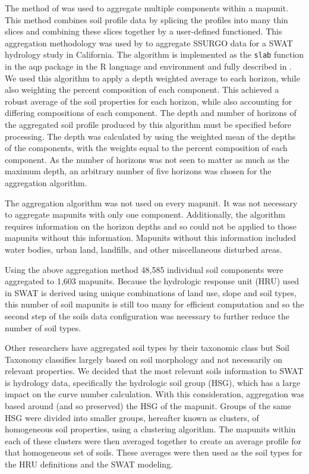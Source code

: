 The method of \citet{beaudette_aqp_2013} was used to aggregate multiple components within a mapunit. This method combines soil profile data by splicing the profiles into many thin slices and combining these slices together by a user-defined functioned. This aggregation methodology was used by \citet{gatzke_soilaggregation_2011} to aggregate SSURGO data for a SWAT hydrology study in California. The algorithm is implemented as the \texttt{slab} function in the aqp package in the R language and environment and fully described in \citet{beaudette_aqp_2013}. We used this algorithm to apply a depth weighted average to each horizon, while also weighting the percent composition of each component. This achieved a robust average of the soil properties for each horizon, while also accounting for differing compositions of each component. The depth and number of horizons of the aggregated soil profile produced by this algorithm must be specified before processing. The depth was calculated by using the weighted mean of the depths of the components, with the weights equal to the percent composition of each component. As the number of horizons was not seen to matter as much as the maximum depth, an arbitrary number of five horizons was chosen for the aggregation algorithm. 

The aggregation algorithm was not used on every mapunit. It was not necessary to aggregate mapunits with only one component. Additionally, the algorithm requires information on the horizon depths and so could not be applied to those mapunits without this information. Mapunits without this information included water bodies, urban land, landfills, and other miscellaneous disturbed areas. 

Using the above aggregation method 48,585 individual soil components were aggregated to 1,603 mapunits. Because the hydrologic response unit (HRU) used in SWAT	is derived using unique combinations of land use, slope and soil types, this number of soil mapunits is still too many for efficient computation  and so the second step of the soils data configuration was necessary to further reduce the number of soil types. %

Other researchers have aggregated soil types by their taxonomic class \citep{gatzke_soilaggregation_2011} but Soil Taxonomy classifies largely based on soil morphology and not necessarily on relevant properties. We decided that the most relevant soils information to SWAT is hydrology data, specifically the hydrologic soil group (HSG), which has a large impact on the curve number calculation. With this consideration, aggregation was based around (and so preserved) the HSG of the mapunit. Groups of the same HSG were divided into smaller groups, hereafter known as clusters, of homogeneous soil properties, using a clustering algorithm. The mapunits within each of these clusters were then averaged together to create an average profile for that homogeneous set of soils. These averages were then used as the soil types for the HRU definitions and the SWAT modeling.

